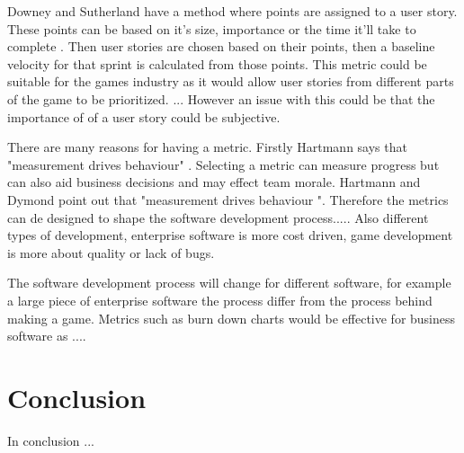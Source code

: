 \documentclass{scrartcl}
\begin{document}
Downey and Sutherland have a method where points are assigned to a user story. These points can be based on it's size, importance or the time it'll take to complete \cite{Downey}. Then user stories are chosen based on their points, then a baseline velocity for that sprint is calculated from those points. This metric could be suitable for the games industry as it would allow user stories from different parts of the game to be prioritized. ... However an issue with this could be that the importance of of a user story could be subjective. 


There are many reasons for having a metric. Firstly Hartmann says that "measurement drives behaviour" \cite{Hartmann}.  %
Selecting a metric can measure progress but can also aid business decisions and may effect team morale. 
Hartmann and Dymond point out that "measurement drives behaviour ". Therefore the metrics can de designed to shape the software development process.....   Also different types of development, enterprise software is more cost driven, game development is more about quality or lack of bugs. 


The software development process will change for different software, for example a large piece of enterprise software the process differ from the process behind making a game. Metrics such as burn down charts would be effective for business software as ....





\section{Conclusion}
In conclusion ... %
	


	
\end{document}
